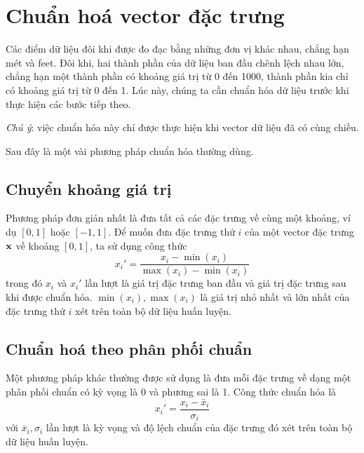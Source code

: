 
\section{Chuẩn hoá vector đặc trưng}

Các điểm dữ liệu đôi khi được đo đạc bằng những đơn vị khác nhau, chẳng hạn mét
và feet. Đôi khi, hai thành phần của dữ liệu ban đầu chênh lệch nhau lớn, chẳng
hạn một thành phần có khoảng giá trị từ 0 đến 1000, thành phần kia chỉ có khoảng
giá trị từ 0 đến 1. Lúc này, chúng ta cần chuẩn hóa dữ liệu trước khi thực hiện
các bước tiếp theo.

\textit{Chú ý}: việc chuẩn hóa này chỉ được thực hiện khi vector dữ liệu đã có cùng chiều.

Sau đây là một vài phương pháp chuẩn hóa thường dùng.

\subsection{Chuyển khoảng giá trị}
Phương pháp đơn giản nhất là đưa tất cả các đặc trưng về cùng một khoảng, ví dụ $[0, 1]$ hoặc $[-1, 1]$. Để muốn đưa đặc trưng thứ
$i$ của một vector đặc trưng $\mathbf{x}$ về khoảng $[0, 1]$, ta sử dụng công thức
\begin{equation*}
x_i' = \frac{x_i - \min(x_i)}{\max(x_i) - \min(x_i)}
\end{equation*}
trong đó $x_i$ và $x_i'$ lần lượt là giá trị đặc trưng ban đầu và giá trị đặc
trưng sau khi được chuẩn hóa. $\min(x_i), \max(x_i)$ là giá trị nhỏ nhất và lớn
nhất của đặc trưng thứ $i$ xét trên toàn bộ dữ liệu huấn luyện.


\subsection{Chuẩn hoá theo phân phối chuẩn}
Một phương pháp khác thường được sử dụng là đưa mỗi đặc trưng về dạng một
phân phối chuẩn có kỳ vọng là 0 và phương sai là 1. Công thức chuẩn hóa
là
\begin{equation*}
x_i' = \frac{x_i - \bar{x}_i}{\sigma_i}
\end{equation*}
với $\bar{x}_i, \sigma_i$ lần lượt là kỳ vọng và độ lệch chuẩn của đặc trưng đó
xét trên toàn bộ dữ liệu huấn luyện.


